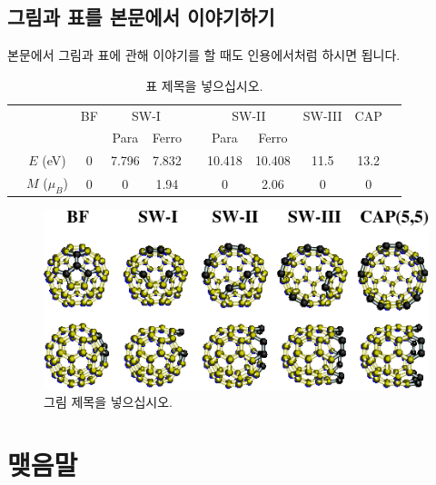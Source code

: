 \documentclass[master,english,final]{kaist-ucs} %
\begin{document}
\section{그림과 표를 본문에서 이야기하기}

본문에서 그림과 표에 관해 이야기를 할 때도 인용에서처럼 하시면 됩니다.

\begin{table}[t]
\caption[캡션제목 넣으십시오]{표 제목을 넣으십시오.
}
\label{mag-tab1}
\begin{center}
\begin{tabular} {ccccccccccc}
\hline\hline
& & BF &\multicolumn{2}{c}{SW-I}&&\multicolumn{2}{c}{SW-II}&SW-III&CAP&\\
\cline{4-5} \cline{7-8}
&               &   &  Para & Ferro &&   Para &  Ferro &      &      &\\
\hline
& $E$ (eV)      & 0 & 7.796 & 7.832 && 10.418 & 10.408 & 11.5 & 13.2 &\\
& $M$ ($\mu_B$) & 0 &     0 &  1.94 &&      0 &   2.06 &    0 &    0 &\\
\hline\hline
\end{tabular}
\end{center}
\end{table}



\begin{figure}[t]
    \centerline{\includegraphics[width=12.5cm]{sample-fig1}}
    \caption[캡션제목 넣으십시오]{그림 제목을 넣으십시오.
    } \label{mag-fig1}
\end{figure}

\chapter{맺음말}
\end{document}
